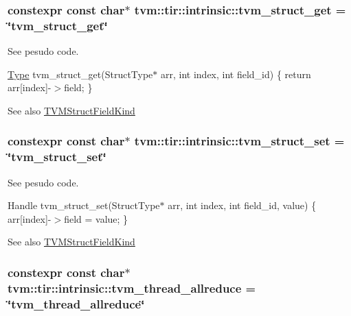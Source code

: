 \subsubsection[{\texorpdfstring{tvm\+\_\+struct\+\_\+get}{tvm_struct_get}}]{\setlength{\rightskip}{0pt plus 5cm}constexpr const char$\ast$ tvm\+::tir\+::intrinsic\+::tvm\+\_\+struct\+\_\+get = \char`\"{}tvm\+\_\+struct\+\_\+get\char`\"{}}\hypertarget{namespacetvm_1_1tir_1_1intrinsic_aba1b46cdb01d149f49d6676b889142b5}{}\label{namespacetvm_1_1tir_1_1intrinsic_aba1b46cdb01d149f49d6676b889142b5}


See pesudo code. 

\hyperlink{classtvm_1_1Type}{Type} tvm\+\_\+struct\+\_\+get(\+Struct\+Type$\ast$ arr, int index, int field\+\_\+id) \{ return arr\mbox{[}index\mbox{]}-\/$>$field; \} \begin{DoxySeeAlso}{See also}
\hyperlink{namespacetvm_1_1tir_1_1intrinsic_a7aee573af86b33b88d123fc26a40cdd9}{T\+V\+M\+Struct\+Field\+Kind} 
\end{DoxySeeAlso}
\subsubsection[{\texorpdfstring{tvm\+\_\+struct\+\_\+set}{tvm_struct_set}}]{\setlength{\rightskip}{0pt plus 5cm}constexpr const char$\ast$ tvm\+::tir\+::intrinsic\+::tvm\+\_\+struct\+\_\+set = \char`\"{}tvm\+\_\+struct\+\_\+set\char`\"{}}\hypertarget{namespacetvm_1_1tir_1_1intrinsic_a2857ab6a0557554feee6e21dbd37eab9}{}\label{namespacetvm_1_1tir_1_1intrinsic_a2857ab6a0557554feee6e21dbd37eab9}


See pesudo code. 

Handle tvm\+\_\+struct\+\_\+set(\+Struct\+Type$\ast$ arr, int index, int field\+\_\+id, value) \{ arr\mbox{[}index\mbox{]}-\/$>$field = value; \} \begin{DoxySeeAlso}{See also}
\hyperlink{namespacetvm_1_1tir_1_1intrinsic_a7aee573af86b33b88d123fc26a40cdd9}{T\+V\+M\+Struct\+Field\+Kind} 
\end{DoxySeeAlso}
\subsubsection[{\texorpdfstring{tvm\+\_\+thread\+\_\+allreduce}{tvm_thread_allreduce}}]{\setlength{\rightskip}{0pt plus 5cm}constexpr const char$\ast$ tvm\+::tir\+::intrinsic\+::tvm\+\_\+thread\+\_\+allreduce = \char`\"{}tvm\+\_\+thread\+\_\+allreduce\char`\"{}}\hypertarget{namespacetvm_1_1tir_1_1intrinsic_a374a98c3ef9da28a660825a0457ae997}{}\label{namespacetvm_1_1tir_1_1intrinsic_a374a98c3ef9da28a660825a0457ae997}


